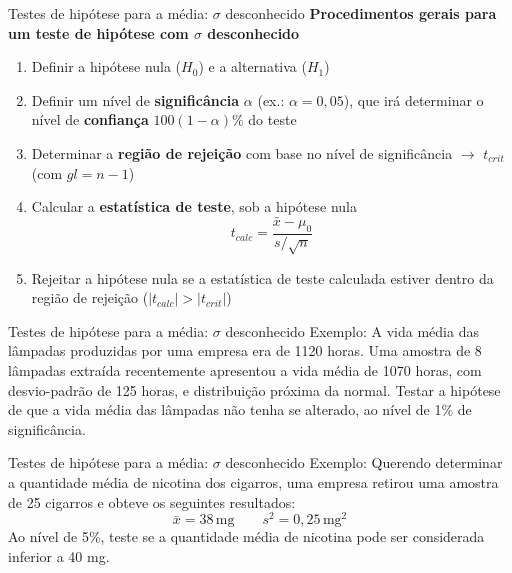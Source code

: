 \documentclass[10pt]{beamer}\usepackage[]{graphicx}\usepackage[]{color}
\theoremstyle{definition}
\begin{document}
\begin{frame}{Testes de hipótese para a média: $\sigma$ desconhecido}
  \textbf{Procedimentos gerais para um teste de hipótese com $\sigma$
    desconhecido}
\begin{enumerate}
\item Definir a hipótese nula ($H_0$) e a alternativa ($H_1$)
\item Definir um nível de \textbf{significância} $\alpha$ (ex.: $\alpha
  = 0,05$), que irá determinar o nível de \textbf{confiança}
  $100(1-\alpha)\%$ do teste
\item Determinar a \textbf{região de rejeição} com base no nível de
  significância $\rightarrow$ $t_{crit}$ (com $gl = n-1$)
\item Calcular a \textbf{estatística de teste}, sob a hipótese nula
  \begin{equation*}
    t_{calc} = \frac{\bar{x} - \mu_0}{s/\sqrt{n}}
  \end{equation*}
\item Rejeitar a hipótese nula se a estatística de teste calculada
  estiver dentro da região de rejeição ($|t_{calc}| > |t_{crit}|$)
\end{enumerate}
\end{frame}

\begin{frame}{Testes de hipótese para a média: $\sigma$ desconhecido}
  Exemplo: A vida média das lâmpadas produzidas por uma empresa era de
  1120 horas. Uma amostra de 8 lâmpadas extraída recentemente apresentou
  a vida média de 1070 horas, com desvio-padrão de 125 horas, e
  distribuição próxima da normal. Testar a hipótese de que a vida média
  das lâmpadas não tenha se alterado, ao nível de 1\% de significância.
\end{frame}

\begin{frame}{Testes de hipótese para a média: $\sigma$ desconhecido}
  Exemplo: Querendo determinar a quantidade média de nicotina dos
  cigarros, uma empresa retirou uma amostra de 25 cigarros e obteve os
  seguintes resultados:
  \begin{equation*}
    \bar{x} = 38 \, \text{mg} \qquad s^2 = 0,25 \, \text{mg}^2
  \end{equation*}
  Ao nível de 5\%, teste se a quantidade média de nicotina pode ser
  considerada inferior a 40 mg.
\end{frame}

\end{document}
